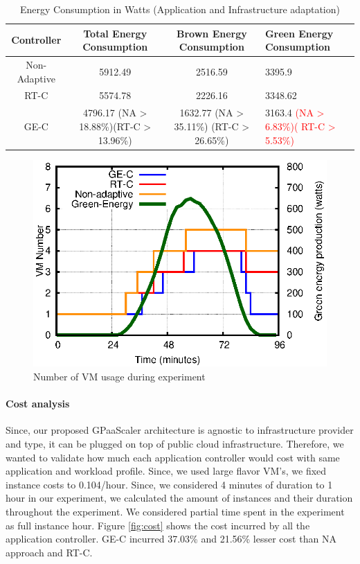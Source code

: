 \begin{table}
\caption{Energy Consumption in Watts (Application and Infrastructure adaptation)}
  \label{tab:watt2}
\begin{tabular}{cccl}
\toprule
Controller & Total Energy Consumption & Brown Energy Consumption & Green Energy Consumption\\
\midrule
Non-Adaptive & 5912.49 & 2516.59 & 3395.9 \\
RT-C & 5574.78 & 2226.16 & 3348.62  \\  %
GE-C & 4796.17 (NA > 18.88\%)(RT-C > 13.96\%) & 1632.77 (NA > 35.11\%) (RT-C > 26.65\%) & 3163.4 \textcolor{red}{(NA > 6.83\%)( RT-C > 5.53\%)} \\
\bottomrule
\end{tabular}
\end{table}

\begin{figure} [htb]
\centering
\includegraphics[scale=.8]{Graphs/vm.eps}
\caption{Number of VM usage during experiment}
\label{fig:vm}
\end{figure}



\paragraph{\textbf{Cost analysis}}

Since, our proposed GPaaScaler architecture is agnostic to infrastructure provider and type, it can be plugged on top of public cloud infrastructure. Therefore, we wanted to validate how much each application controller would cost with same application and workload profile. Since, we used large flavor VM's, we fixed instance costs to 0.104\textdollar/hour. Since, we considered 4 minutes of duration to 1 hour in our experiment, we calculated the amount of instances and their duration throughout the experiment. We considered partial time spent in the experiment as full instance hour. Figure \ref{fig:cost} shows the cost incurred by all the application controller. GE-C incurred 37.03\% and 21.56\% lesser cost than NA approach and RT-C.

